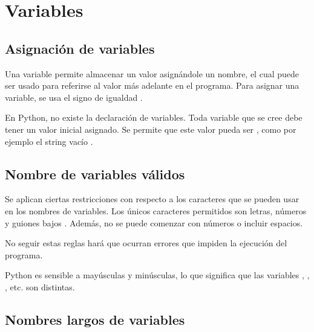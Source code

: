 \chapter{Variables}

\section{Asignación de variables}

Una variable permite almacenar un valor asignándole un nombre, el cual puede ser usado para referirse al valor más adelante en el programa.
Para asignar una variable, se usa el signo de igualdad \ttt{=}.


En Python, no existe la declaración de variables.
Toda variable que se cree debe tener un valor inicial asignado.
Se permite que este valor pueda ser , como por ejemplo el string vacío \ttt{\qq \qq}.

\section{Nombre de variables válidos}

Se aplican ciertas restricciones con respecto a los caracteres que se pueden usar en los nombres de variables.
Los únicos caracteres permitidos son letras, números y guiones bajos \ttt{\_}.
Además, no se puede comenzar con números o incluir espacios.
\medskip

No seguir estas reglas hará que ocurran errores que impiden la ejecución del programa.




Python es sensible a mayúsculas y minúsculas, lo que significa que las variables , , , etc. son distintas.


\section{Nombres largos de variables}

